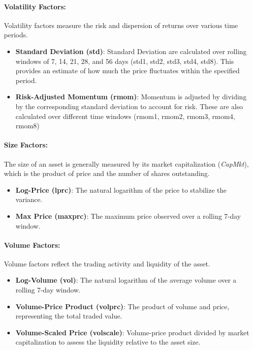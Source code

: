 \documentclass{article}
\begin{document}
\paragraph{Volatility Factors:}
Volatility factors measure the risk and dispersion of returns over various time periods. 
\begin{itemize}
    \item \textbf{Standard Deviation (std)}: Standard Deviation are calculated over rolling windows of 7, 14, 21, 28, and 56 days (std1, std2, std3, std4, std8). This provides an estimate of how much the price fluctuates within the specified period. 
    \item \textbf{Risk-Adjusted Momentum (rmom)}: Momentum is adjusted by dividing by the corresponding standard deviation to account for risk. These are also calculated over different time windows (rmom1, rmom2, rmom3, rmom4, rmom8)
\end{itemize}

\paragraph{Size Factors:}
The size of an asset is generally measured by its market capitalization (\textit{CapMkt}), which is the product of price and the number of shares outstanding. 
\begin{itemize}
    \item \textbf{Log-Price (lprc)}: The natural logarithm of the price to stabilize the variance. 
    \item \textbf{Max Price (maxprc)}: The maximum price observed over a rolling 7-day window. 
\end{itemize}

\paragraph{Volume Factors:}
Volume factors reflect the trading activity and liquidity of the asset. 
\begin{itemize}
    \item \textbf{Log-Volume (vol)}: The natural logarithm of the average volume over a rolling 7-day window. 
    \item \textbf{Volume-Price Product (volprc)}: The product of volume and price, representing the total traded value. 
    \item \textbf{Volume-Scaled Price (volscale)}: Volume-price product divided by market capitalization to assess the liquidity relative to the asset size. 
\end{itemize}
\end{document}
